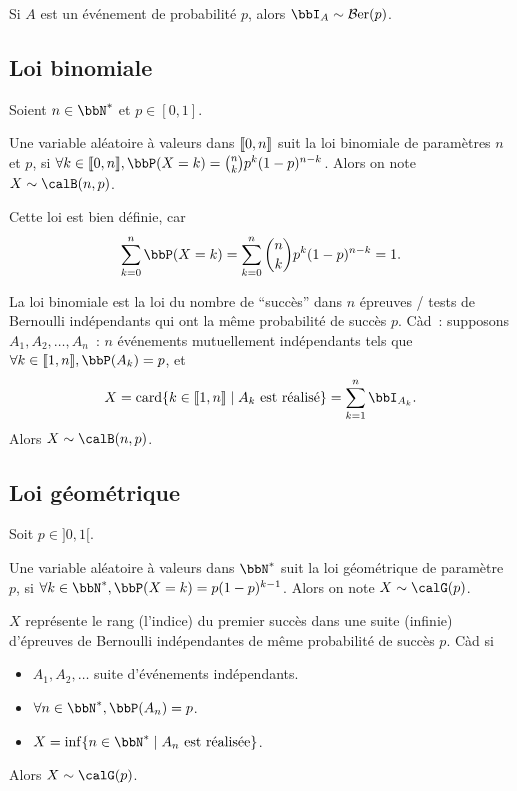 \begin{exem}
    Si $A$ est un événement de probabilité $p$,
    alors $\bbI_A \sim \ber(p)$.
\end{exem}

\subsection{Loi binomiale}

Soient $n \in \bbN^*$ et $p \in [0, 1]$.

\begin{deff}
    Une variable aléatoire à valeurs dans $\llbracket 0, n \rrbracket$ suit la loi binomiale de paramètres $n$ et $p$,
    si $\forall k \in \llb 0, n \rrb, \bbP(X = k) = \binom{n}{k} p^k(1 - p)^{n - k}$.
    Alors on note $X \sim \calB(n, p)$.
\end{deff}

\begin{rqq}
    Cette loi est bien définie, car
    \[ \sum_{k = 0}^n \bbP(X = k) = \sum_{k = 0}^n \binom{n}{k} p^k(1 - p)^{n - k} = 1. \]
\end{rqq}

\begin{rqq}[Interprétation]
    La loi binomiale est la loi du nombre de ``succès'' dans $n$ épreuves / tests de Bernoulli indépendants
    qui ont la même probabilité de succès $p$.
    Càd~: supposons $A_1, A_2, \ldots, A_n$~: $n$ événements mutuellement indépendants tels que
    $\forall k \in \llb 1, n \rrb, \bbP(A_k) = p$, et
    \[ X = \card \{ k \in \llb 1, n \rrb \mid A_k \text{ est réalisé} \} = \sum_{k = 1}^n \bbI_{A_k}. \]
    Alors $X \sim \calB(n, p)$.
\end{rqq}

\subsection{Loi géométrique}
Soit $p \in ]0, 1[$.

\begin{deff}
    Une variable aléatoire à valeurs dans $\bbN^*$ suit la loi géométrique de paramètre $p$,
    si $\forall k \in \bbN^*, \bbP(X = k) = p(1 - p)^{k - 1}$.
    Alors on note $X \sim \calG(p)$.
\end{deff}

\begin{rqq}[Interprétation]
    $X$ représente le rang (l'indice) du premier succès dans une suite (infinie)
    d'épreuves de Bernoulli indépendantes de même probabilité de succès $p$.
    Càd si
    \begin{itemize}
        \item $A_1, A_2, \ldots$ suite d'événements indépendants.
        \item $\forall n \in \bbN^*, \bbP(A_n) = p$.
        \item $X = \inf \{ n \in \bbN^* \mid A_n \text{ est réalisée} \}$.
    \end{itemize}
    Alors $X \sim \calG(p)$.
\end{rqq}

